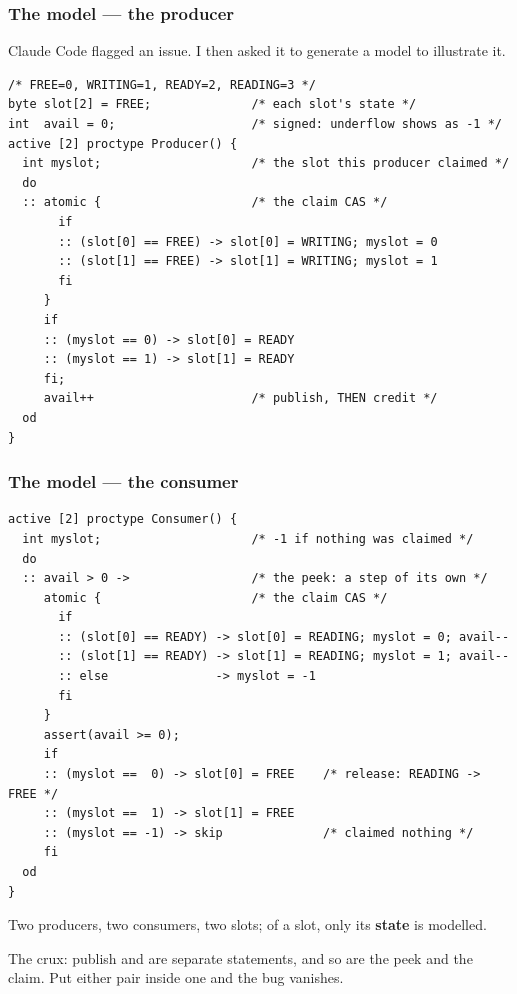 \begin{frame}[fragile]
  \frametitle{The model --- the producer} \small

Claude Code flagged an issue. I then asked it to generate a \promelaname{} model
to illustrate it.

\begin{lstlisting}[language=promela]
/* FREE=0, WRITING=1, READY=2, READING=3 */
byte slot[2] = FREE;              /* each slot's state */
int  avail = 0;                   /* signed: underflow shows as -1 */
active [2] proctype Producer() {
  int myslot;                     /* the slot this producer claimed */
  do
  :: atomic {                     /* the claim CAS */
       if
       :: (slot[0] == FREE) -> slot[0] = WRITING; myslot = 0
       :: (slot[1] == FREE) -> slot[1] = WRITING; myslot = 1
       fi
     }
     if
     :: (myslot == 0) -> slot[0] = READY
     :: (myslot == 1) -> slot[1] = READY
     fi;
     avail++                      /* publish, THEN credit */
  od
}
\end{lstlisting}

\end{frame}

\begin{frame}[fragile]
  \frametitle{The model --- the consumer} \small

\begin{lstlisting}[language=promela]
active [2] proctype Consumer() {
  int myslot;                     /* -1 if nothing was claimed */
  do
  :: avail > 0 ->                 /* the peek: a step of its own */
     atomic {                     /* the claim CAS */
       if
       :: (slot[0] == READY) -> slot[0] = READING; myslot = 0; avail--
       :: (slot[1] == READY) -> slot[1] = READING; myslot = 1; avail--
       :: else               -> myslot = -1
       fi
     }
     assert(avail >= 0);
     if
     :: (myslot ==  0) -> slot[0] = FREE    /* release: READING -> FREE */
     :: (myslot ==  1) -> slot[1] = FREE
     :: (myslot == -1) -> skip              /* claimed nothing */
     fi
  od
}
\end{lstlisting}

Two producers, two consumers, two slots; of a slot, only its {\bf state} is
modelled.

\pause

The crux: publish and  are separate statements, and so are the
peek and the claim. Put either pair inside one  and the bug
vanishes.

\end{frame}

